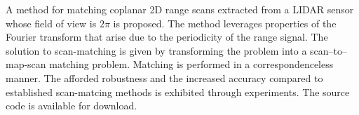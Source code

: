 A method for matching coplanar 2D range scans extracted from a LIDAR sensor
whose field of view is $2\pi$ is proposed. The method leverages properties of
the Fourier transform that arise due to the periodicity of the range signal.
The solution to scan-matching is given by transforming the problem into
a scan--to--map-scan matching problem. Matching is performed in a
correspondenceless manner. The afforded robustness and the increased accuracy
compared to established scan-matcing methods is exhibited through experiments.
The source code is available for download.
